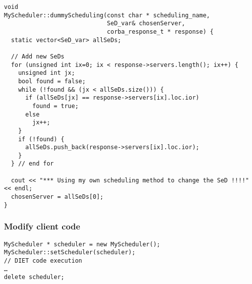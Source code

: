 \begin{verbatim}
void
MyScheduler::dummyScheduling(const char * scheduling_name,
                             SeD_var& chosenServer,
                             corba_response_t * response) {
  static vector<SeD_var> allSeDs;

  // Add new SeDs
  for (unsigned int ix=0; ix < response->servers.length(); ix++) {
    unsigned int jx;
    bool found = false;
    while (!found && (jx < allSeDs.size())) {
      if (allSeDs[jx] == response->servers[ix].loc.ior) 
        found = true;
      else
        jx++;
    }
    if (!found) {
      allSeDs.push_back(response->servers[ix].loc.ior);
    }
  } // end for

  cout << "*** Using my own scheduling method to change the SeD !!!!" << endl;
  chosenServer = allSeDs[0];
}
\end{verbatim}


\subsubsection{Modify client code}

\begin{verbatim}
MyScheduler * scheduler = new MyScheduler();
MyScheduler::setScheduler(scheduler);
// DIET code execution
…
delete scheduler;
\end{verbatim}